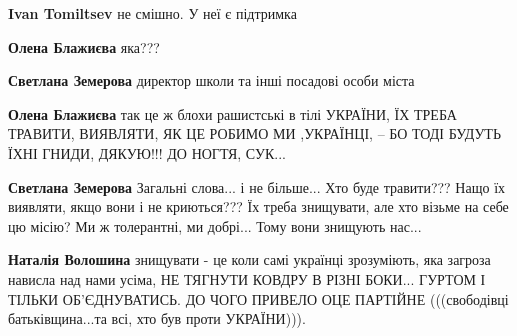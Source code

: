 \begin{itemize}
\begin{itemize}
\textbf{Ivan Tomiltsev} не смішно. У неї є підтримка

 
\textbf{Олена Блажиєва} яка???

 
\textbf{Светлана Земерова} директор школи та інші посадові особи міста

 
\textbf{Олена Блажиєва} так це ж блохи рашистські в тілі УКРАЇНИ, ЇХ ТРЕБА ТРАВИТИ, ВИЯВЛЯТИ, ЯК ЦЕ РОБИМО МИ ,УКРАЇНЦІ, -- БО ТОДІ БУДУТЬ ЇХНІ ГНИДИ, ДЯКУЮ!!! ДО НОГТЯ, СУК...

 
\textbf{Светлана Земерова} Загальні слова... і не більше... Хто буде травити??? Нащо їх виявляти, якщо вони і не криються??? Їх треба знищувати, але хто візьме на себе цю місію? Ми ж толерантні, ми добрі... Тому вони знищують нас...

 
\textbf{Наталія Волошина} знищувати - це коли самі українці зрозуміють, яка
загроза нависла над нами усіма, НЕ ТЯГНУТИ КОВДРУ В РІЗНІ БОКИ... ГУРТОМ І
ТІЛЬКИ ОБ'ЄДНУВАТИСЬ. ДО ЧОГО ПРИВЕЛО ОЦЕ ПАРТІЙНЕ (((свободівці
батьківщина...та всі, хто був проти УКРАЇНИ))).

 

\end{itemize}
\end{itemize}

